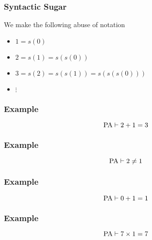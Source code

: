 \documentclass{beamer}
\theoremstyle{indentDefn} \newtheorem{defn}[]{Definition}
\begin{document}
\begin{frame}
	\frametitle{Syntactic Sugar}
	
	We make the following abuse of notation 
	\begin{center}
		\begin{itemize}
			\item[] $1 = s(0)$
			\item[] $2 = s(1) = s(s(0))$
			\item[] $3 = s(2) = s(s(1)) = s(s(s(0)))$
			\item[] $\vdots$
		\end{itemize}
	\end{center}
	
\end{frame}

\begin{frame}
	\frametitle{Example}
	
	$$ \text{PA} \vdash 2 + 1 = 3$$
	
	\vspace{6cm}
	
	
\end{frame}

\begin{frame}
	\frametitle{Example}
	
	$$ \text{PA} \vdash 2 \neq 1$$

	\vspace{6cm}
	
	
\end{frame}

\begin{frame}
	\frametitle{Example}
	
	$$ \text{PA} \vdash 0 + 1 = 1$$
	
	\vspace{6cm}
	
\end{frame}

\begin{frame}
	\frametitle{Example}
	
	$$ \text{PA} \vdash 7 \times 1 = 7$$
	
	\vspace{6cm}
	
\end{frame}
\end{document}
